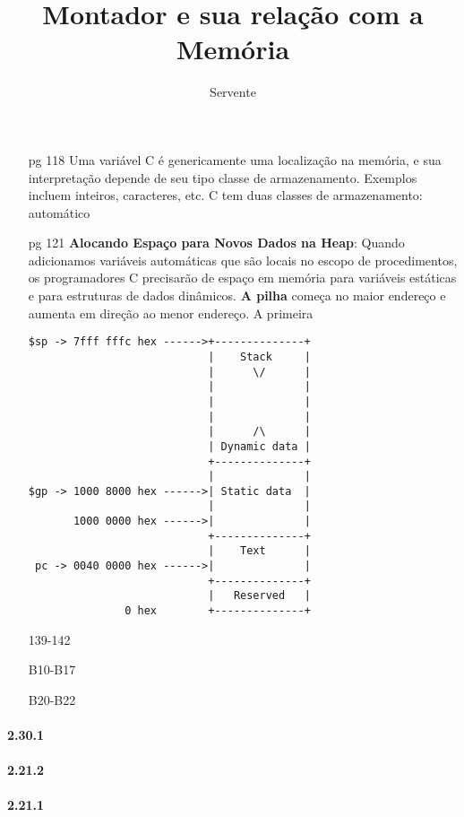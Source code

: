 \documentclass{article}
\author{Servente}
\title{Montador e sua relação com a Memória}
\begin{document}
\maketitle

\begin{enumerate}

\item[pg 118] Uma variável C é genericamente uma localização na memória, e sua 
interpretação depende de seu tipo classe de armazenamento. Exemplos incluem 
inteiros, caracteres, etc. C tem duas classes de armazenamento: automático  
\item[pg 121] \textbf{Alocando Espaço para Novos Dados na Heap}: Quando 
adicionamos variáveis automáticas que são locais no escopo de procedimentos, os 
programadores C precisarão de espaço em memória para variáveis estáticas e para 
estruturas de dados dinâmicos. \textbf{A pilha} começa no maior endereço e 
aumenta em direção ao menor endereço. A primeira 

\begin{verbatim}
$sp -> 7fff fffc hex ------>+--------------+
                            |    Stack     |
                            |      \/      |
                            |              |
                            |              |
                            |              |
                            |      /\      |
                            | Dynamic data |
                            +--------------+
                            |              |
$gp -> 1000 8000 hex ------>| Static data  |
                            |              |
       1000 0000 hex ------>|              |
                            +--------------+
                            |    Text      |
 pc -> 0040 0000 hex ------>|              |
                            +--------------+
                            |   Reserved   |
               0 hex        +--------------+
\end{verbatim}

\item[139-142]
\item[B10-B17]
\item[B20-B22]

\end{enumerate}

\paragraph{2.30.1}

\paragraph{2.21.2}

\paragraph{2.21.1}
\end{document}
